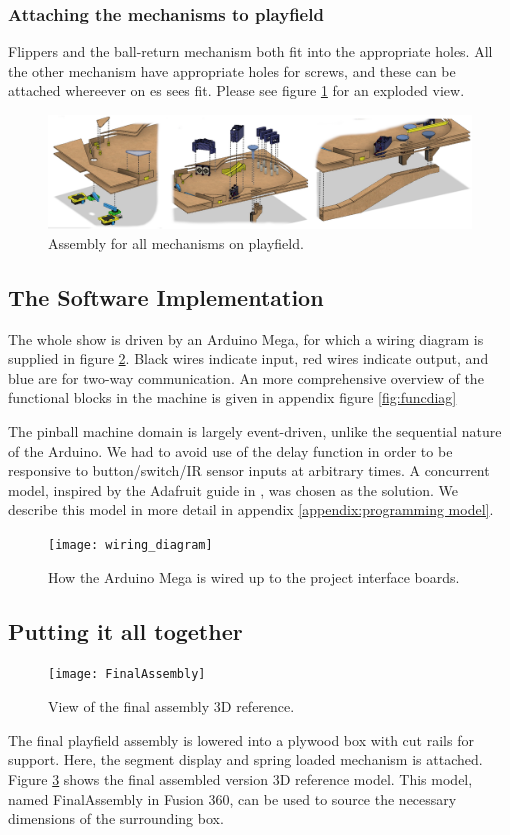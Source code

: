 \subsubsection{Attaching the mechanisms to playfield}
Flippers and the ball-return mechanism both fit into the appropriate holes. All the other mechanism have appropriate holes for screws, and these can be attached whereever on	es sees fit. Please see figure \ref{fig:mechanismassembly} for an exploded view.
\begin{figure}
	\centering
	\includegraphics[width=\textwidth]{img/PlayFieldMechanismAssembly}
	\caption{Assembly for all mechanisms on playfield.}
	\label{fig:mechanismassembly}
\end{figure}

\subsection{The Software Implementation}
The whole show is driven by an Arduino Mega, for which a wiring diagram is supplied in figure \ref{fig:wiring}.
Black wires indicate input, {\color{red} red} wires indicate output, and {\color{blue} blue} are for two-way communication. 
An more comprehensive overview of the functional blocks in the machine is given in appendix figure \ref{fig:funcdiag}

The pinball machine domain is largely event-driven, unlike the sequential nature of the Arduino. 
We had to avoid use of the delay function in order to be responsive to button/switch/IR sensor inputs at arbitrary times. 
A concurrent model, inspired by the Adafruit guide in \cite{multitasking_arduino}, was chosen as the solution. We describe this model in more detail in appendix \ref{appendix:programming model}.
\begin{figure}[h]
	\centering
	\texttt{[image: wiring\_diagram]}
	\caption{How the Arduino Mega is wired up to the project interface boards.}
	\label{fig:wiring}
\end{figure}
\subsection{Putting it all together}
\begin{figure}[h]
	\texttt{[image: FinalAssembly]}
	\caption{View of the final assembly 3D reference.}
	\label{fig:finalassembly}
\end{figure} 
The final playfield assembly is lowered into a plywood box with cut rails for support. Here, the segment display and spring loaded mechanism is attached. Figure \ref{fig:finalassembly} shows the final assembled version 3D reference model. This model, named FinalAssembly in Fusion 360, can be used to source the necessary dimensions of the surrounding box.


